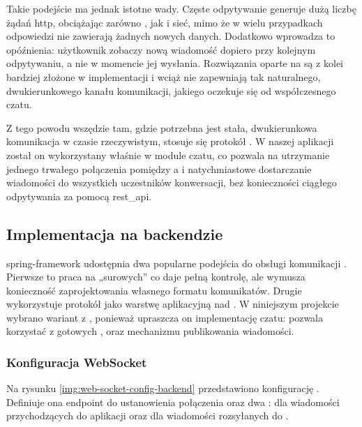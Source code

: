Takie podejście ma jednak istotne wady. Częste odpytywanie  generuje dużą liczbę żądań \gls{http},
obciążając zarówno , jak i sieć, mimo że w wielu przypadkach odpowiedzi nie zawierają żadnych nowych danych.
Dodatkowo wprowadza to opóźnienia: użytkownik zobaczy nową wiadomość dopiero przy kolejnym odpytywaniu, a nie w momencie jej wysłania.
Rozwiązania oparte na  są z kolei bardziej złożone w implementacji i wciąż nie zapewniają
tak naturalnego, dwukierunkowego kanału komunikacji, jakiego oczekuje się od współczesnego czatu.

Z tego powodu wszędzie tam, gdzie potrzebna jest stała, dwukierunkowa komunikacja w czasie rzeczywistym,
stosuje się protokół .
W naszej aplikacji został on wykorzystany właśnie w module czatu, co pozwala na utrzymanie jednego trwałego połączenia
pomiędzy  a  i natychmiastowe dostarczanie wiadomości do wszystkich uczestników
konwersacji, bez konieczności ciągłego odpytywania  za pomocą \gls{rest_api}.

\subsection{Implementacja na backendzie}
\label{subsec:implementacja-na-backendzie}

\gls{spring-framework} udostępnia dwa popularne podejścia do obsługi komunikacji .
Pierwsze to praca na „surowych”   co daje pełną kontrolę,
ale wymusza konieczność zaprojektowania własnego formatu komunikatów.
Drugie wykorzystuje protokół  jako warstwę aplikacyjną nad .
W niniejszym projekcie wybrano wariant z , ponieważ upraszcza on implementację czatu:
pozwala korzystać z gotowych , 
oraz mechanizmu publikowania wiadomości.

\subsubsection{Konfiguracja WebSocket}
\label{subsubsec:ws-config-backend}

Na rysunku \ref{img:web-socket-config-backend} przedstawiono konfigurację .
Definiuje ona \gls{endpoint} do ustanowienia połączenia oraz dwa  :
dla wiadomości przychodzących do aplikacji oraz dla wiadomości rozsyłanych do .


